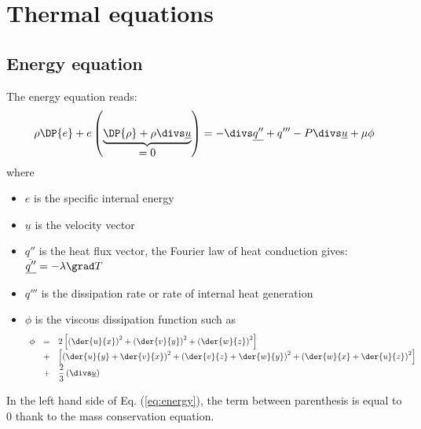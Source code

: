 \section{Thermal equations}

\subsection{Energy equation}
The energy equation reads:
\begin{equation}
 \rho \DP{e} + e \left(\underbrace{\DP{\rho} + \rho \divs \underline{u}}_{\displaystyle =0} \right)= -\divs \underline{q''}+q'''-P\divs \underline{u} + \mu \phi 
\label{eq:energy}
\end{equation}
where 
\begin{itemize}
       \item $e$ is the specific internal energy
       \item $\underline{u}$ is the velocity vector
       \item $\underline{q''}$ is the heat flux vector, the Fourier law of heat conduction gives: $\displaystyle \underline{q''}=-\lambda \grad T$
       \item $q'''$ is the dissipation rate or rate of internal heat generation
       \item $\phi$ is the viscous dissipation function such as
	  \begin{equation}
	    \begin{array}{rcl}
	      \phi & = & 2\left[\left(\der{u}{x}\right)^2 + \left(\der{v}{y}\right)^2 + \left(\der{w}{z}\right)^2\right]\\
		   & + &  \left[\left(\der{u}{y}+\der{v}{x}\right)^2 + \left(\der{v}{z}+\der{w}{y}\right)^2 + \left(\der{w}{x} + \der{u}{z}\right)^2\right]\\
		   & + &  \dfrac{2}{3}\left( \divs \underline{u}\right)
	    \end{array}
	  \end{equation}
      \end{itemize}
\begin{remark}
 In the left hand side of Eq. (\ref{eq:energy}), the term between parenthesis is equal to $0$ thank to the mass conservation equation.
\end{remark}

